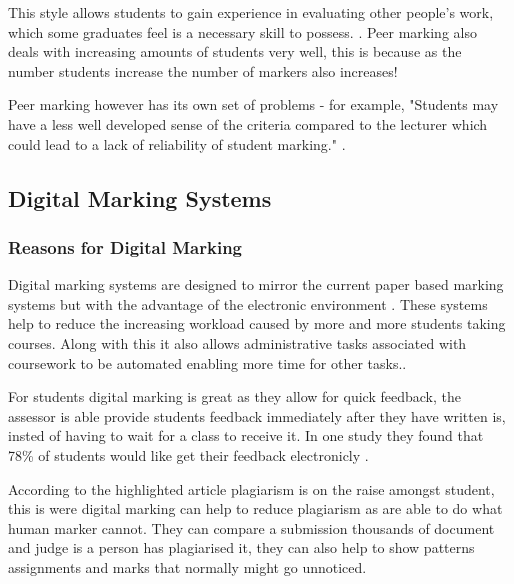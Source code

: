 \documentclass[12pt]{article}  %
\begin{document}
This style allows  students to gain experience in evaluating other people's work, which some graduates feel is a necessary skill to possess. \cite{langan_insights_????}. Peer marking also deals with increasing amounts of students very well, this is because as the number students increase the number of markers also increases!

Peer marking however has its own set of problems - for example, "Students may have a less well developed sense of the criteria compared to the lecturer which could lead to a lack of reliability of student marking." \cite{orsmond_use_2000}. 



\subsection{Digital Marking Systems}

\subsubsection{Reasons for Digital Marking}
Digital marking systems are designed to mirror the current paper based marking systems but with the advantage of the electronic environment \cite{heinrich_online_2003}. These systems help to reduce the increasing workload caused by more and more students taking courses. Along with this it also allows administrative tasks associated with coursework to be automated enabling more time for other tasks.\cite{joy_effective_1998}. 

For students digital marking is great as they allow for quick feedback, the assessor is able provide students feedback immediately after they have written is, insted of having to wait for a class to receive it. In one study\cite{dahl_turnitin_2007} they found that 78\% of students would like get their feedback  electronicly .

According to the highlighted article \cite{derby_duplication_2008} plagiarism is on the raise amongst student, this is were digital marking can help to reduce plagiarism as are able to do what human marker cannot. They can compare a submission thousands of document and judge is a person has plagiarised it, they can also help to show patterns assignments and marks that normally might go unnoticed.  
\end{document}
